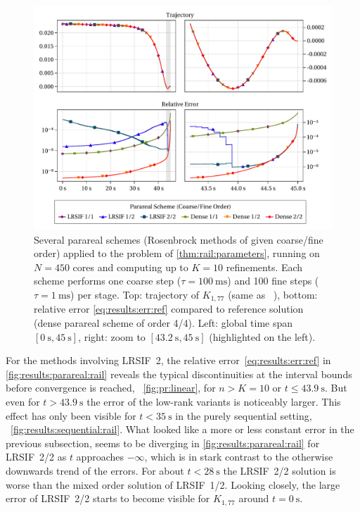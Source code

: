 \begin{figure}[tp]
  \centering
  \includegraphics[width=\textwidth]{figures/fig_results_parareal.pdf}
  \caption[Parareal method applied to Rail problem]{%
    Several parareal schemes (Rosenbrock methods of given coarse/fine order)
    applied to the problem of \autoref{thm:rail:parameters},
    running on $N=450$ cores and
    computing up to $K=10$ refinements.
    Each scheme performs
    one coarse step ($\tau=\SI{100}{\milli\second}$) and
    100 fine steps ($\tau=\SI{1}{\milli\second}$) per stage.
    Top: trajectory of $K_{1,77}$ (same as \citeauthor*{Lang2015}~\cite[Fig.~1]{Lang2015}),
    bottom: relative error \eqref{eq:results:err:ref} compared to reference solution
    (dense parareal scheme of order 4/4).
    Left: global time span $[\SI{0}{\second}, \SI{45}{\second}]$,
    right: zoom to $[\SI[round-mode=off]{43.2}{\second}, \SI{45}{\second}]$ (highlighted on the left).
  }
  \label{fig:results:parareal:rail}
\end{figure}

For the methods involving \ac{LRSIF}~2,
the relative error~\eqref{eq:results:err:ref} in \autoref{fig:results:parareal:rail} reveals
the typical discontinuities at the interval bounds
before convergence is reached,
\cf~\autoref{fig:pr:linear},
for $n > K = 10$ or $t \leq \SI[round-precision=1]{43.9}{\second}$.
But even for $t > \SI[round-precision=1]{43.9}{\second}$ the error of the low-rank variants is noticeably larger.
This effect has only been visible for $t < \SI{35}{\second}$ in the purely sequential setting,
\cf~\autoref{fig:results:sequential:rail}.
What looked like a more or less constant error in the previous subsection,
seems to be diverging in \autoref{fig:results:parareal:rail} for \ac{LRSIF}~2/2 as $t$ approaches $-\infty$,
which is in stark contrast to the otherwise downwards trend of the errors.
For about $t < \SI{28}{\second}$ the \ac{LRSIF}~2/2 solution is worse than the mixed order solution of \ac{LRSIF}~1/2.
Looking closely, the large error of \ac{LRSIF}~2/2 starts to become visible for $K_{1,77}$ around $t=\SI{0}{\second}$.


